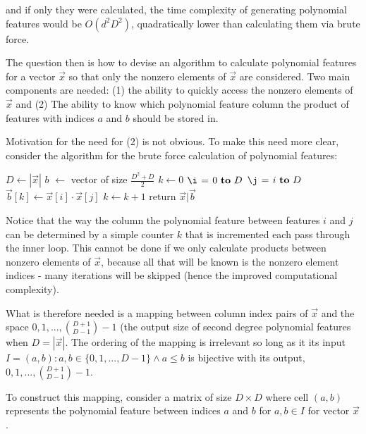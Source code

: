 \documentclass[11pt]{article}
\begin{document}
and if only they were calculated, the time complexity of generating polynomial features
would be $O(d^2D^2)$, quadratically lower than calculating them via brute force.

The question then is how to devise an algorithm to calculate polynomial features for a vector $\vec{x}$ so that
only the nonzero elements of $\vec{x}$ are considered. Two main components are needed: (1) the ability to
quickly access the nonzero elements of $\vec{x}$ and (2) The ability to know which polynomial feature column
the product of features with indices $a$ and $b$ should be stored in.

Motivation for the need for (2) is not obvious. To make this need more clear, consider the
algorithm for the brute force calculation of polynomial features:

\begin{codebox}
    \zi $D \gets |\vec{x}|$
    \zi $b$ $\gets$ vector of size $\frac{D^2+D}{2}$
    \zi $k \gets 0$
    \zi \For $\i \gets 0 \To D$ \Do
    \zi     \For $\j \gets i \To D$ \Do
    \zi         $\vec{b}[k] \gets \vec{x}[i] \cdot \vec{x}[j]$
    \zi         $k \gets k + 1$
            \End
        \End
    \End
    return $\vec{x} | \vec{b}$
\end{codebox}

Notice that the way the column the polynomial feature between features $i$ and $j$ can be determined
by a simple counter $k$ that is incremented each pass through the inner loop. This cannot be
done if we only calculate products between nonzero elements of $\vec{x}$, because all that
will be known is the nonzero element indices - many iterations will be skipped (hence the improved computational complexity).

What is therefore needed is a mapping between column index pairs of $\vec{x}$ and the space ${0, 1, ..., \binom{D+1}{D-1}-1}$
(the output size of second degree polynomial features when $D = |\vec{x}|$. The ordering of the mapping is irrelevant so long as
it its input $ I = {(a, b) : a, b \in \{0,1,..., D-1\} \land a \le b}$ is bijective with its output, ${0, 1, ..., \binom{D+1}{D-1}-1}$.

To construct this mapping, consider a matrix of size $D \times D$ where cell $(a,b)$ represents the
polynomial feature between indices $a$ and $b$ for $a,b \in I$ for vector $\vec{x}$.
\end{document}
